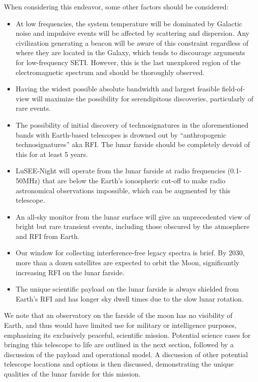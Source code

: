 When considering this endeavor, some other factors should be considered:
\begin{itemize}
    \item At low frequencies, the system temperature will be dominated by Galactic noise and impulsive events will be affected by scattering and dispersion. Any civilization generating a beacon will be aware of this constraint regardless of where they are located in the Galaxy, which tends to discourage arguments for low-frequency SETI.  However, this is the last unexplored region of the electromagnetic spectrum and should be thoroughly observed.
    \item Having the widest possible absolute bandwidth and largest feasible field-of-view will maximize the possibility for serendipitous discoveries, particularly of rare events.
    \item The possibility of initial discovery of technosignatures in the aforementioned bands with Earth-based telescopes is drowned out by ``anthropogenic technosignatures'' aka RFI.  The lunar farside should be completely devoid of this for at least 5 years.
   \item LuSEE-Night will operate from the lunar farside at radio frequencies (0.1-50MHz) that are below the Earth's ionospheric cut-off to make radio astronomical observations impossible, which can be augmented by this telescope.
    \item An all-sky monitor from the lunar surface will give an unprecedented view of bright but rare transient events, including those obscured by the atmosphere and RFI from Earth.
    \item Our window for collecting interference-free legacy spectra is brief. By 2030, more than a dozen satellites are expected to orbit the Moon, significantly increasing RFI on the lunar farside.
    \item The unique scientific payload on the lunar farside is always shielded from Earth's RFI and has longer sky dwell times due to the slow lunar rotation.
\end{itemize}

We note that an observatory on the farside of the moon has no visibility of Earth, and thus would have limited use for military or intelligence purposes, emphasizing its exclusively peaceful, scientific mission. Potential science cases for bringing this telescope to life are outlined in the next section, followed by a discussion of the payload and operational model.  A discussion of other potential telescope locations and options is then discussed, demonstrating the unique qualities of the lunar farside for this mission.